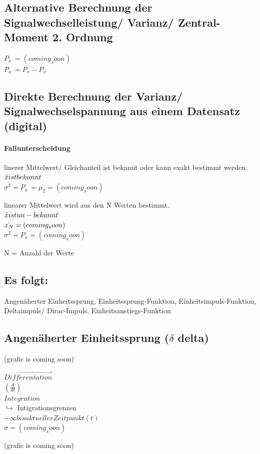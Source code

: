 \documentclass{article}
\begin{document}
\subsection*{Alternative Berechnung der Signalwechselleistung/ Varianz/ Zentral-Moment 2. Ordnung}
$P_{x~} = (coming_soon)$ \\
$P_{x~} = P_x - P_x$

\subsection*{Direkte Berechnung der Varianz/ Signalwechselspannung aus einem Datensatz (digital)}
\paragraph{Fallunterscheidung}
\begin{paracol}{2}
    linerer Mittelwert/ Gleichanteil ist bekannt oder kann exakt bestimmt werden. \\
    $\Bar{x} ist bekannt$ \\
    $\sigma^2 = P_{x~} = \mu_2 = (coming_soon)$
    
    \switchcolumn
    linearer Mittelwert wird aus den N Werten bestimmt. \\
    $\Bar{x} ist un-bekannt$ \\
    $\Bar{x_N} = (coming_soon)$ \\
    $\sigma^2 = P_x = (coming_soon)$
\end{paracol}
\begin{center} N = Anzahl der Werte \end{center}

\subsection*{Es folgt:}
Angenäherter Einheitssprung, Einheitssprung-Funktion, Einheitsimpuls-Funktion, Deltaimpuls/ Dirac-Impuls, Einheitsanstiegs-Funktion

\subsection*{Angenäherter Einheitssprung ($\delta$ delta)}
\begin{paracol}{3}
	(grafic is coming soon)

	\switchcolumn
	\begin{center}
    		$\overrightarrow{Differentation}$ \\
		$(\frac{d}{dt})$ \\
		\vspace{1em}
		$\overleftarrow{Integration}$ \\
		$\hookrightarrow$ Intigrationsgrenzen \\
		$-\infty bis aktueller Zeitpunkt (t)$ \\
		$\sigma = (coming_soon)$
	\end{center}

	\switchcolumn
	(grafic is coming soon)
\end{paracol}
\end{document}
